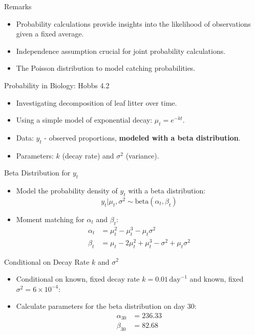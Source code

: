 \documentclass{beamer}
\begin{document}
\begin{frame}{Remarks}
  \begin{itemize}
    \item Probability calculations provide insights into the likelihood of observations given a fixed average.
    \item Independence assumption crucial for joint probability calculations.
    \item The Poisson distribution to model catching probabilities.
  \end{itemize}
\end{frame}

\begin{frame}{Probability in Biology: Hobbs 4.2}
  \begin{itemize}
    \item Investigating decomposition of leaf litter over time.
    \item Using a simple model of exponential decay: \(\mu_t = e^{-kt}\).
    \item Data: \(y_t\) - observed proportions, {\bf{modeled with a beta distribution}}.
    \item Parameters: \(k\) (decay rate) and \(\sigma^2\) (variance).
  \end{itemize}
\end{frame}

\begin{frame}{Beta Distribution for \(y_t\)}
  \begin{itemize}
    \item Model the probability density of \(y_t\) with a beta distribution:
    \[ y_t | \mu_t, \sigma^2 \sim \text{beta}(\alpha_t, \beta_t) \]
    \item Moment matching for \(\alpha_t\) and \(\beta_t\):
    \begin{align*}
      \alpha_t &= \mu_t^2 - \mu_t^3 - \mu_t \sigma^2 \\
      \beta_t &= \mu_t - 2\mu_t^2 + \mu_t^3 - \sigma^2 + \mu_t \sigma^2
    \end{align*}
  \end{itemize}
\end{frame}

\begin{frame}{Conditional on Decay Rate \(k\) and \(\sigma^2\)}
  \begin{itemize}
    \item Conditional on known, fixed decay rate \(k = 0.01 \, \text{day}^{-1}\) and known, fixed \(\sigma^2 = 6 \times 10^{-4}\):
    \item Calculate parameters for the beta distribution on day 30:
    \begin{align*}
      \alpha_{30} &= 236.33 \\
      \beta_{30} &= 82.68
    \end{align*}
  \end{itemize}
\end{frame}
\end{document}
